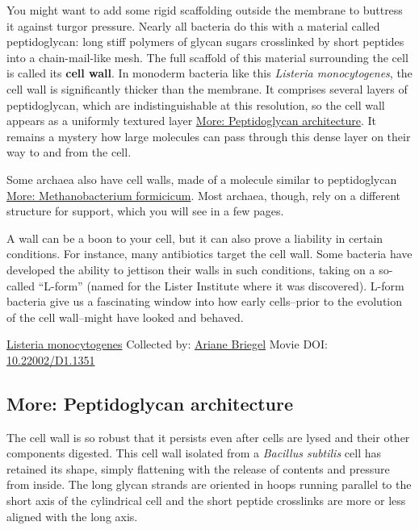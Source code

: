 \documentclass[]{tufte-book}
\begin{document}
You might want to add some rigid scaffolding outside the membrane to buttress it against turgor pressure. Nearly all bacteria do this with a material called peptidoglycan: long stiff polymers of glycan sugars crosslinked by short peptides into a chain-mail-like mesh. The full scaffold of this material surrounding the cell is called its \textbf{cell wall}. In monoderm bacteria like this \emph{Listeria monocytogenes}, the cell wall is significantly thicker than the membrane. It comprises several layers of peptidoglycan, which are indistinguishable at this resolution, so the cell wall appears as a uniformly textured layer \protect\hyperlink{Peptidoglycan_architecture}{More: Peptidoglycan architecture}. It remains a mystery how large molecules can pass through this dense layer on their way to and from the cell.

Some archaea also have cell walls, made of a molecule similar to peptidoglycan \protect\hyperlink{Methanobacterium_formicicum}{More: Methanobacterium formicicum}. Most archaea, though, rely on a different structure for support, which you will see in a few pages.

A wall can be a boon to your cell, but it can also prove a liability in certain conditions. For instance, many antibiotics target the cell wall. Some bacteria have developed the ability to jettison their walls in such conditions, taking on a so-called ``L-form'' (named for the Lister Institute where it was discovered). L-form bacteria give us a fascinating window into how early cells--prior to the evolution of the cell wall--might have looked and behaved.



\hypertarget{htmlwidget-f7f5a5ce220020ed42af}{}

\label{fig:2-2}\protect\hyperlink{tree}{Listeria monocytogenes} Collected by: \protect\hyperlink{ariane_briegel}{Ariane Briegel} Movie DOI: \href{https://doi.org/10.22002/D1.1351}{10.22002/D1.1351}

\hypertarget{Peptidoglycan_architecture}{%
\subsection*{More: Peptidoglycan architecture}\label{Peptidoglycan_architecture}}

The cell wall is so robust that it persists even after cells are lysed and their other components digested. This cell wall isolated from a \emph{Bacillus subtilis} cell has retained its shape, simply flattening with the release of contents and pressure from inside. The long glycan strands are oriented in hoops running parallel to the short axis of the cylindrical cell and the short peptide crosslinks are more or less aligned with the long axis.
\end{document}
